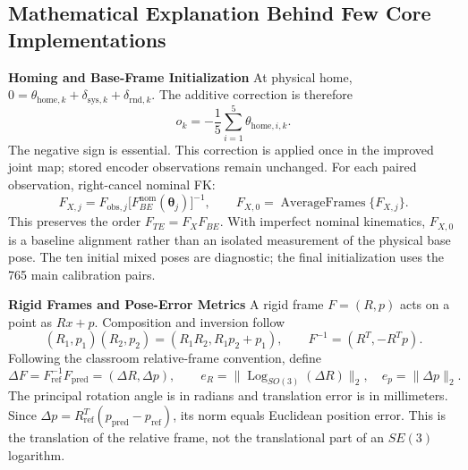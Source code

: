 \documentclass[11pt,letterpaper]{article}
\newcommand{\thv}{\bm{\theta}}
\begin{document}
\subsection{Mathematical Explanation Behind Few Core Implementations}

\textbf{Homing and Base-Frame Initialization}
At physical home, $0=\theta_{\mathrm{home},k}+\delta_{\mathrm{sys},k}+\delta_{\mathrm{rnd},k}$. The additive correction is therefore
\begin{equation}
 o_k=-\frac{1}{5}\sum_{i=1}^{5}\theta_{\mathrm{home},i,k}.
\end{equation}
The negative sign is essential. This correction is applied once in the improved joint map; stored encoder observations remain unchanged. For each paired observation, right-cancel nominal FK:
\begin{equation}
 F_{X,j}=F_{\mathrm{obs},j}\big[F_{BE}^{\mathrm{nom}}(\thv_j)\big]^{-1},
 \qquad F_{X,0}=\operatorname{AverageFrames}\{F_{X,j}\}.
\end{equation}
This preserves the order $F_{TE}=F_XF_{BE}$. With imperfect nominal kinematics, $F_{X,0}$ is a baseline alignment rather than an isolated measurement of the physical base pose. The ten initial mixed poses are diagnostic; the final initialization uses the 765 main calibration pairs.

\textbf{Rigid Frames and Pose-Error Metrics}
A rigid frame $F=(R,p)$ acts on a point as $Rx+p$. Composition and inversion follow
\begin{equation}
(R_1,p_1)(R_2,p_2)=(R_1R_2,R_1p_2+p_1),\qquad
F^{-1}=(R^T,-R^Tp).
\end{equation}
Following the classroom relative-frame convention, define
\begin{equation}\label{eq:pose_error}
\Delta F=F_{\mathrm{ref}}^{-1}F_{\mathrm{pred}}=(\Delta R,\Delta p),\qquad
e_R=\|\operatorname{Log}_{SO(3)}(\Delta R)\|_2,\quad e_p=\|\Delta p\|_2.
\end{equation}
The principal rotation angle is in radians and translation error is in millimeters. Since $\Delta p=R_{\mathrm{ref}}^T(p_{\mathrm{pred}}-p_{\mathrm{ref}})$, its norm equals Euclidean position error. This is the translation of the relative frame, not the translational part of an $SE(3)$ logarithm.
\end{document}
